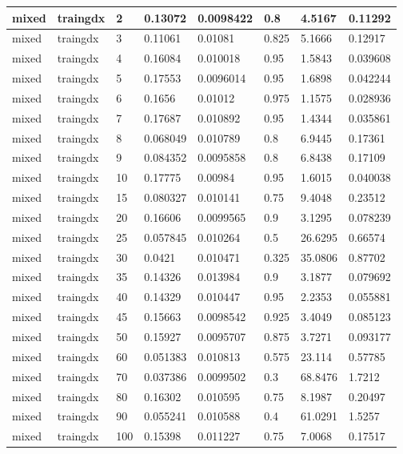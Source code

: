\begin{longtable}{llllllll}
mixed & traingdx & 2 & 0.13072 & 0.0098422 & 0.8 & 4.5167 & 0.11292 \\ \hline 
mixed & traingdx & 3 & 0.11061 & 0.01081 & 0.825 & 5.1666 & 0.12917 \\ \hline 
mixed & traingdx & 4 & 0.16084 & 0.010018 & 0.95 & 1.5843 & 0.039608 \\ \hline 
mixed & traingdx & 5 & 0.17553 & 0.0096014 & 0.95 & 1.6898 & 0.042244 \\ \hline 
mixed & traingdx & 6 & 0.1656 & 0.01012 & 0.975 & 1.1575 & 0.028936 \\ \hline 
mixed & traingdx & 7 & 0.17687 & 0.010892 & 0.95 & 1.4344 & 0.035861 \\ \hline 
mixed & traingdx & 8 & 0.068049 & 0.010789 & 0.8 & 6.9445 & 0.17361 \\ \hline 
mixed & traingdx & 9 & 0.084352 & 0.0095858 & 0.8 & 6.8438 & 0.17109 \\ \hline 
mixed & traingdx & 10 & 0.17775 & 0.00984 & 0.95 & 1.6015 & 0.040038 \\ \hline 
mixed & traingdx & 15 & 0.080327 & 0.010141 & 0.75 & 9.4048 & 0.23512 \\ \hline 
mixed & traingdx & 20 & 0.16606 & 0.0099565 & 0.9 & 3.1295 & 0.078239 \\ \hline 
mixed & traingdx & 25 & 0.057845 & 0.010264 & 0.5 & 26.6295 & 0.66574 \\ \hline 
mixed & traingdx & 30 & 0.0421 & 0.010471 & 0.325 & 35.0806 & 0.87702 \\ \hline 
mixed & traingdx & 35 & 0.14326 & 0.013984 & 0.9 & 3.1877 & 0.079692 \\ \hline 
mixed & traingdx & 40 & 0.14329 & 0.010447 & 0.95 & 2.2353 & 0.055881 \\ \hline 
mixed & traingdx & 45 & 0.15663 & 0.0098542 & 0.925 & 3.4049 & 0.085123 \\ \hline 
mixed & traingdx & 50 & 0.15927 & 0.0095707 & 0.875 & 3.7271 & 0.093177 \\ \hline 
mixed & traingdx & 60 & 0.051383 & 0.010813 & 0.575 & 23.114 & 0.57785 \\ \hline 
mixed & traingdx & 70 & 0.037386 & 0.0099502 & 0.3 & 68.8476 & 1.7212 \\ \hline 
mixed & traingdx & 80 & 0.16302 & 0.010595 & 0.75 & 8.1987 & 0.20497 \\ \hline 
mixed & traingdx & 90 & 0.055241 & 0.010588 & 0.4 & 61.0291 & 1.5257 \\ \hline 
mixed & traingdx & 100 & 0.15398 & 0.011227 & 0.75 & 7.0068 & 0.17517 \\ \hline 

\end{longtable}
